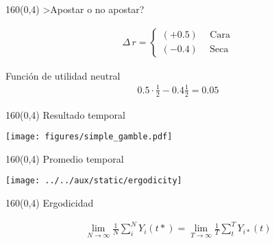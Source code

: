 \documentclass[shownotes,aspectratio=169]{beamer}
\begin{document}
\begin{frame}[plain]
 \begin{textblock}{160}(0,4)
  \centering \Large >Apostar o no apostar?
 \end{textblock}
 \vspace{1cm}
 
 \begin{align*}
 \Delta \,r = 
      \begin{cases*}
       (+0.5) & \ \ \text{Cara} \\
       (-0.4) & \ \ \text{Seca}
    \end{cases*}
 \end{align*}

 \pause
 \vspace{1cm}
 \centering
 
 Función de utilidad neutral
 \begin{align*}
  0.5\cdot \frac{1}{2} - 0.4 \frac{1}{2} = 0.05
 \end{align*} 
 
 
\end{frame}


\begin{frame}[plain]
 \begin{textblock}{160}(0,4)
  \centering \Large Resultado temporal
 \end{textblock}
 

 \centering
\vspace{1cm}
 
\texttt{[image: figures/simple\_gamble.pdf]}

\end{frame}

\begin{frame}[plain]
 \begin{textblock}{160}(0,4)
  \centering \Large Promedio temporal
 \end{textblock}
 \vspace{1cm}
 
 
 \centering
\texttt{[image: ../../aux/static/ergodicity]}

\end{frame}

\begin{frame}[plain]
 \begin{textblock}{160}(0,4)
  \centering \Large Ergodicidad
 \end{textblock}


 \begin{align*}
  \lim_{N\rightarrow \infty} \frac{1}{N} \sum_i^N Y_i(t*) = \lim_{T\rightarrow \infty} \frac{1}{T} \sum_t^T Y_{i*}(t)
 \end{align*}

\end{frame}
\end{document}
